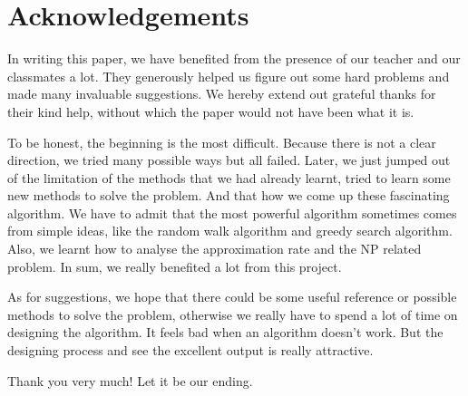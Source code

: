 \documentclass{article}
\begin{document}
\section{Acknowledgements}    
    In writing this paper, we have benefited from the presence of our teacher and our classmates a lot. They generously helped us figure out some hard problems and made many invaluable suggestions. We hereby extend out grateful thanks for their kind help, without which the paper would not have been what it is.
    
    To be honest, the beginning is the most difficult. Because there is not a clear direction, we tried many possible ways but all failed. Later, we just jumped out of the limitation of the methods that we had already learnt, tried to learn some new methods to solve the problem. And that how we come up these fascinating algorithm. We have to admit that the most powerful algorithm sometimes comes from simple ideas, like the random walk algorithm and greedy search algorithm. Also, we learnt how to analyse the approximation rate and the NP related problem. In sum, we really benefited a lot from this project.
    
    As for suggestions, we hope that there could be some useful reference or possible methods to solve the problem, otherwise we really have to spend a lot of time on designing the algorithm. It feels bad when an algorithm doesn't work. But the designing process and see the excellent output is really attractive.
    
    Thank you very much! Let it be our ending.
\end{document}
